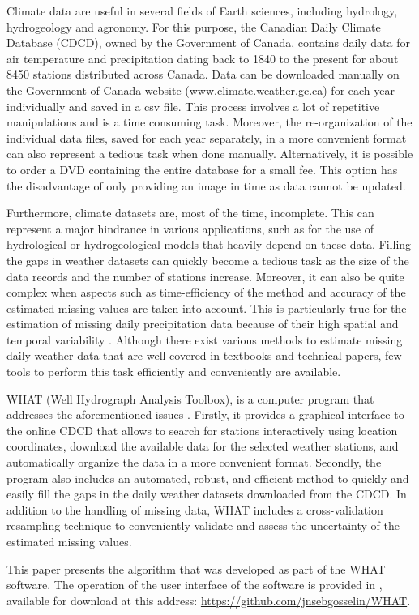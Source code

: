 \documentclass[ARTICLETHERMIC.tex]{subfiles}
\begin{document}
Climate data are useful in several fields of Earth sciences, including hydrology, hydrogeology and agronomy. For this purpose, the Canadian Daily Climate Database (CDCD), owned by the Government of Canada, contains daily data for air temperature and precipitation dating back to 1840 to the present for about 8450 stations distributed across Canada. Data can be downloaded manually on the Government of Canada website (\url{www.climate.weather.gc.ca}) for each year individually and saved in a csv file. This process involves a lot of repetitive manipulations and is a time consuming task. Moreover, the re-organization of the individual data files, saved for each year separately, in a more convenient format can also represent a tedious task when done manually. Alternatively, it is possible to order a DVD containing the entire database for a small fee. This option has the disadvantage of only providing an image in time as data cannot be updated.  

Furthermore, climate datasets are, most of the time, incomplete. This can represent a major hindrance in various applications, such as for the use of hydrological or hydrogeological models that heavily depend on these data. Filling the gaps in weather datasets can quickly become a tedious task as the size of the data records and the number of stations increase. Moreover, it can also be quite complex when aspects such as time-efficiency of the method and accuracy of the estimated missing values are taken into account. This is particularly true for the estimation of missing daily precipitation data because of their high spatial and temporal variability \citep{simolo_improving_2010}. Although there exist various methods to estimate missing daily weather data that are well covered in textbooks and technical papers, few tools to perform this task efficiently and conveniently are available. 

WHAT (Well Hydrograph Analysis Toolbox), is a computer program that addresses the aforementioned issues \citep{gosselin_user_2015}. Firstly, it provides a graphical interface to the online CDCD that allows to search for stations interactively using location coordinates, download the available data for the selected weather stations, and automatically organize the data in a more convenient format. Secondly, the program also includes an automated, robust, and efficient method to quickly and easily fill the gaps in the daily weather datasets downloaded from the CDCD. In addition to the handling of missing data, WHAT includes a cross-validation resampling technique to conveniently validate and assess the uncertainty of the estimated missing values.


This paper presents the algorithm that was developed as part of the WHAT software. The operation of the user interface of the software is provided in \cite{gosselin_what_2015}, available for download at this address: \url{https://github.com/jnsebgosselin/WHAT}.

\end{document}
